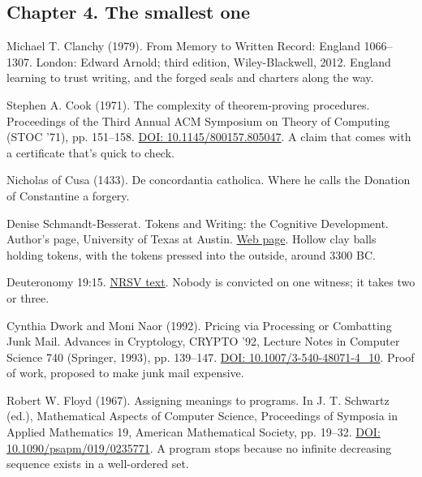 \subsection*{Chapter 4. The smallest one}

\noindent Michael T. Clanchy (1979). From Memory to Written Record: England 1066--1307. London: Edward Arnold; third edition, Wiley-Blackwell, 2012. England learning to trust writing, and the forged seals and charters along the way.
\par\medskip

\noindent Stephen A. Cook (1971). The complexity of theorem-proving procedures. Proceedings of the Third Annual ACM Symposium on Theory of Computing (STOC '71), pp. 151--158. \href{https://doi.org/10.1145/800157.805047}{DOI: 10.1145/800157.805047}. A claim that comes with a certificate that's quick to check.
\par\medskip

\noindent Nicholas of Cusa (1433). De concordantia catholica. Where he calls the Donation of Constantine a forgery.
\par\medskip

\noindent Denise Schmandt-Besserat. Tokens and Writing: the Cognitive Development. Author's page, University of Texas at Austin. \href{https://sites.utexas.edu/dsb/tokens/tokens-and-writing-the-cognitive-development/}{Web page}. Hollow clay balls holding tokens, with the tokens pressed into the outside, around 3300 BC.
\par\medskip

\noindent Deuteronomy 19:15. \href{https://www.biblegateway.com/passage/?search=Deuteronomy+19:15&version=NRSV}{NRSV text}. Nobody is convicted on one witness; it takes two or three.
\par\medskip

\noindent Cynthia Dwork and Moni Naor (1992). Pricing via Processing or Combatting Junk Mail. Advances in Cryptology, CRYPTO '92, Lecture Notes in Computer Science 740 (Springer, 1993), pp. 139--147. \href{https://doi.org/10.1007/3-540-48071-4_10}{DOI: 10.1007/3-540-48071-4\_10}. Proof of work, proposed to make junk mail expensive.
\par\medskip

\noindent Robert W. Floyd (1967). Assigning meanings to programs. In J. T. Schwartz (ed.), Mathematical Aspects of Computer Science, Proceedings of Symposia in Applied Mathematics 19, American Mathematical Society, pp. 19--32. \href{https://doi.org/10.1090/psapm/019/0235771}{DOI: 10.1090/psapm/019/0235771}. A program stops because no infinite decreasing sequence exists in a well-ordered set.
\par\medskip

